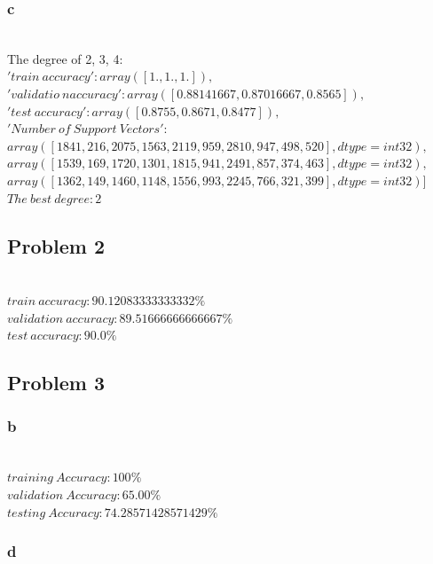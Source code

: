 \documentclass[12pt]{article}
\begin{document}
            \subsubsection{c}
\\ The degree of 2, 3, 4:
\\$'train\ accuracy': array([1., 1., 1.]),$
\\$'validatio\ naccuracy': array ([0.88141667, 0.87016667, 0.8565]),$
\\$'test\ accuracy': array ([0.8755, 0.8671, 0.8477]),$
\\$'Number\ of\ Support\ Vectors': $
\\$array([1841,  216, 2075, 1563, 2119,  959, 2810,  947,  498,  520], dtype=int32),$
\\$array([1539,  169, 1720, 1301, 1815,  941, 2491,  857,  374,  463], dtype=int32),$
\\$array([1362,  149, 1460, 1148, 1556,  993, 2245,  766,  321,  399], dtype=int32)]$
\\ $The\ best\ degree: 2$
        \subsection{Problem 2}
\\$train\ accuracy: 90.12083333333332 \%$
\\$validation\ accuracy: 89.51666666666667 \%$
\\$test\ accuracy: 90.0 \%$
        \subsection{Problem 3}
            \subsubsection{b}
\\$training\ Accuracy: 100\%$
\\$validation\ Accuracy: 65.00\%$
\\$testing\ Accuracy: 74.28571428571429\%$
            \subsubsection{d}
\end{document}
